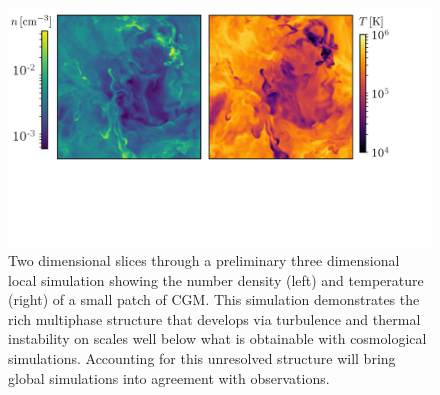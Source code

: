 \documentclass[11pt,letterpaper,english]{article}
\begin{document}
\begin{figure}[t]
 \centering
 \includegraphics[width=1.0\textwidth]{Denstiy_Temperature.pdf} 
\caption{Two dimensional slices through a preliminary three dimensional local simulation showing the number density (left) and temperature (right) of a small patch of CGM. This simulation demonstrates the rich multiphase structure that develops via turbulence and thermal instability on scales well below what is obtainable with cosmological simulations. Accounting for this unresolved structure will bring global simulations into agreement with observations. \label{fig:CGMpatch}}
\end{figure}

\end{document}
